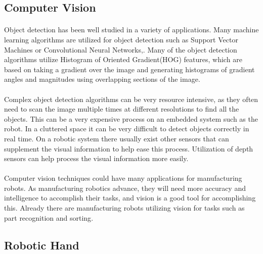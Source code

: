 \documentclass[titlepage,letterpaper,12pt]{article}
\begin{document}
\subsection{Computer Vision}
\paragraph{}Object detection has been well studied in a variety of applications.
Many machine learning algorithms are utilized for object detection such as
Support Vector Machines or Convolutional Neural
Networks\cite{Barbu2012},\cite{krizhevsky2012imagenet}. Many of the object
detection algorithms utilize Histogram of Oriented Gradient(HOG) features, which
are based on taking a gradient over the image and generating histograms of
gradient angles and magnitudes using overlapping sections of the
image\cite{Dalal2005}. 

\paragraph{}Complex object detection algorithms can be very resource intensive,
as they often need to scan the image multiple times at different resolutions to
find all the objects\cite{Felzenszwalb2013}. This can be a very expensive
process on an embedded system such as the robot. In a cluttered space it can be
very difficult to detect objects correctly in real time. On a robotic system
there usually exist other sensors that can supplement the visual information to
help ease this process. Utilization of depth sensors can help process the visual
information more easily\cite{Gould2008}.

\paragraph{}Computer vision techniques could have many applications for
manufacturing robots. As manufacturing robotics advance, they will need more
accuracy and intelligence to accomplish their tasks, and vision is a good tool
for accomplishing this. Already there are manufacturing robots utilizing vision
for tasks such as part recognition and sorting\cite{SIRfuture}.

\subsection{Robotic Hand}
\end{document}
